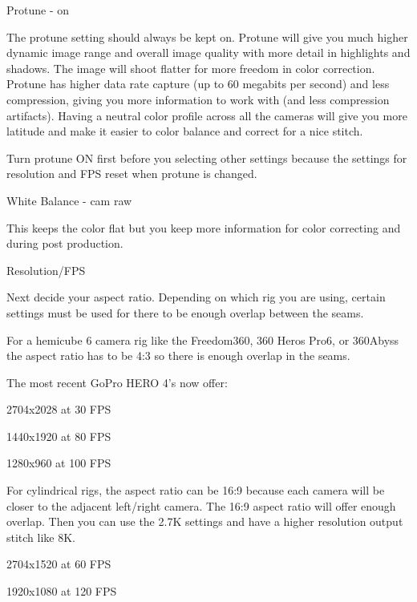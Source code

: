 \begin{fullwidth}
{\large Protune - on \par}


The protune setting should always be kept on. Protune will give you much higher dynamic image range and overall image quality with more detail in highlights and shadows. The image will shoot flatter for more freedom in color correction. Protune has higher data rate capture (up to 60 megabits per second) and less compression, giving you more information to work with (and less compression artifacts). Having a neutral color profile across all the cameras will give you more latitude and make it easier to color balance and correct for a nice stitch. 

\tip Turn protune ON first before you selecting other settings because the settings for resolution and FPS reset when protune is changed.


{\large White Balance - cam raw \par} 


This keeps the color flat but you keep more information for color correcting and \textbf{} during post production.

{\large Resolution/FPS \par}

Next decide your aspect ratio. Depending on which rig you are using, certain settings must be used for there to be enough overlap between the seams. 

For a hemicube 6 camera rig like the Freedom360, 360 Heros Pro6, or 360Abyss the aspect ratio has to be 4:3 so there is enough overlap in the seams. 

The most recent GoPro HERO 4's now offer:

2704x2028 at 30 FPS

1440x1920 at 80 FPS

\clearpage
1280x960 at 100 FPS


For cylindrical rigs, the aspect ratio can be 16:9 because each camera will be closer to the adjacent left/right camera. The 16:9 aspect ratio will offer enough overlap. Then you can use the 2.7K settings and have a higher resolution output stitch like 8K. 

2704x1520 at 60 FPS


\clearpage
1920x1080 at 120 FPS


\end{fullwidth}
